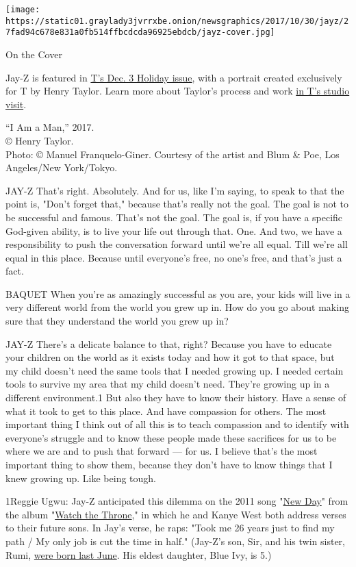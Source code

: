 \texttt{[image: https://static01.graylady3jvrrxbe.onion/newsgraphics/2017/10/30/jayz/27fad94c678e831a0fb514ffbcdcda96925ebdcb/jayz-cover.jpg]}

On the Cover

Jay-Z is featured in
\href{https://www.nytimes3xbfgragh.onion/issue/t-magazine/2017/11/17/ts-dec-3-holiday-issue}{T's
Dec. 3 Holiday issue}, with a portrait created exclusively for T by
Henry Taylor. Learn more about Taylor's process and work
\href{https://www.nytimes3xbfgragh.onion/2017/11/29/t-magazine/henry-taylor-jay-z-painting.html}{in
T's studio visit}.

``I Am a Man,'' 2017.\\
© Henry Taylor.\\
Photo: © Manuel Franquelo-Giner. Courtesy of the artist and Blum \& Poe,
Los Angeles/New York/Tokyo.

JAY-Z That's right. Absolutely. And for us, like I'm saying, to speak to
that the point is, "Don't forget that," because that's really not the
goal. The goal is not to be successful and famous. That's not the goal.
The goal is, if you have a specific God-given ability, is to live your
life out through that. One. And two, we have a responsibility to push
the conversation forward until we're all equal. Till we're all equal in
this place. Because until everyone's free, no one's free, and that's
just a fact.

BAQUET When you're as amazingly successful as you are, your kids will
live in a very different world from the world you grew up in. How do you
go about making sure that they understand the world you grew up in?

JAY-Z There's a delicate balance to that, right? Because you have to
educate your children on the world as it exists today and how it got to
that space, but my child doesn't need the same tools that I needed
growing up. I needed certain tools to survive my area that my child
doesn't need. They're growing up in a different environment.1 But also
they have to know their history. Have a sense of what it took to get to
this place. And have compassion for others. The most important thing I
think out of all this is to teach compassion and to identify with
everyone's struggle and to know these people made these sacrifices for
us to be where we are and to push that forward --- for us. I believe
that's the most important thing to show them, because they don't have to
know things that I knew growing up. Like being tough.

1Reggie Ugwu: Jay-Z anticipated this dilemma on the 2011 song
"\href{https://open.spotify.com/track/3SIgBSv9D8Nm3CvP0o0Q9Z}{New Day}"
from the album
"\href{https://open.spotify.com/album/2P2Xwvh2xWXIZ1OWY9S9o5}{Watch the
Throne}," in which he and Kanye West both address verses to their future
sons. In Jay's verse, he raps: "Took me 26 years just to find my path /
My only job is cut the time in half." (Jay-Z's son, Sir, and his twin
sister, Rumi,
\href{https://www.nytimes3xbfgragh.onion/2017/07/14/arts/music/beyonce-twins-photo.html}{were
born last June}. His eldest daughter, Blue Ivy, is 5.)

